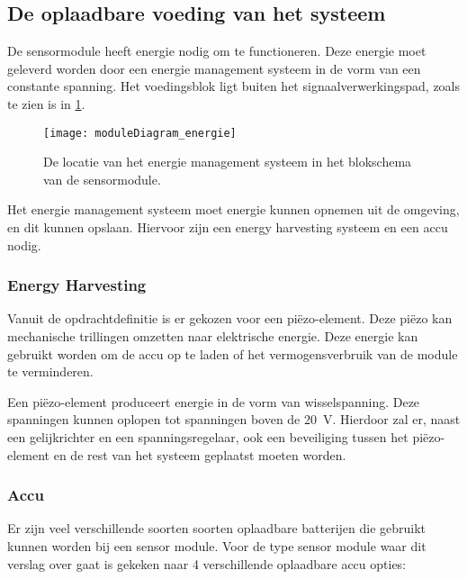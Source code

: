 

\subsection{De oplaadbare voeding van het systeem} \label{sec:energy}

De sensormodule heeft energie nodig om te functioneren. Deze energie moet geleverd worden door een energie management systeem in de vorm van een constante spanning. Het voedingsblok ligt buiten het signaalverwerkingspad, zoals te zien is in \cref{fig:moduleDiagram_energie}.

\begin{figure}[!htbp]
    \centering
    \texttt{[image: moduleDiagram\_energie]}
    \caption{De locatie van het energie management systeem in het blokschema van de sensormodule.}
    \label{fig:moduleDiagram_energie}
\end{figure}

Het energie management systeem moet energie kunnen opnemen uit de omgeving, en dit kunnen opslaan. Hiervoor zijn een energy harvesting systeem en een accu nodig.

\subsubsection{Energy Harvesting} \label{sec:harvesting}

Vanuit de opdrachtdefinitie is er gekozen voor een piëzo-element. Deze piëzo kan mechanische trillingen omzetten naar elektrische energie. Deze energie kan gebruikt worden om de accu op te laden of het vermogensverbruik van de module te verminderen.

Een piëzo-element produceert energie in de vorm van wisselspanning. Deze spanningen kunnen oplopen tot spanningen boven de \qty{20}{\volt}.%
Hierdoor zal er, naast een gelijkrichter en een spanningsregelaar, ook een beveiliging tussen het piëzo-element en de rest van het systeem geplaatst moeten worden.


\subsubsection{Accu} \label{sec:batterijOntwerp}
Er zijn veel verschillende soorten soorten oplaadbare batterijen die gebruikt kunnen worden bij een sensor module. 
Voor de type sensor module waar dit verslag over gaat is gekeken naar 4 verschillende oplaadbare accu opties\cite{battery_comparison}:

